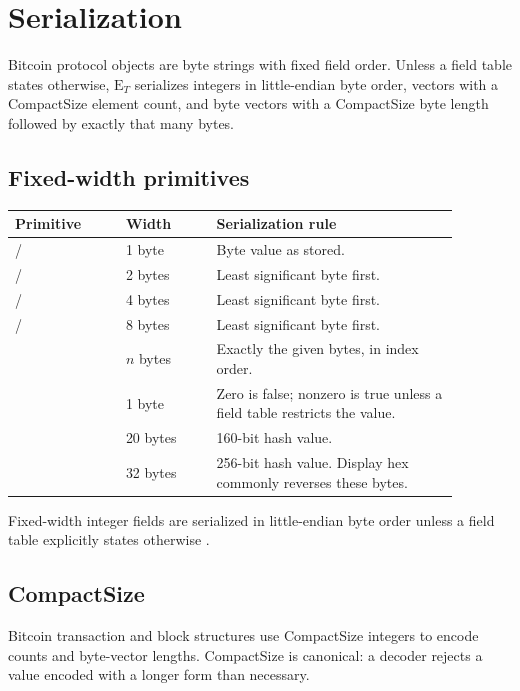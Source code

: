 \section{Serialization}
\label{sec:serialization}

Bitcoin protocol objects are byte strings with fixed field order. Unless a
field table states otherwise, \(\mathrm{E}_{T}\) serializes integers in
little-endian byte order, vectors with a CompactSize element count, and byte
vectors with a CompactSize byte length followed by exactly that many bytes.

\subsection{Fixed-width primitives}

\begin{longtable}{@{}L{0.22\linewidth}L{0.18\linewidth}L{0.48\linewidth}@{}}
\toprule
Primitive & Width & Serialization rule \\
\midrule
{} /  & 1 byte & Byte value as stored. \\
 /  & 2 bytes & Least significant byte first. \\
 /  & 4 bytes & Least significant byte first. \\
 /  & 8 bytes & Least significant byte first. \\
 & $n$ bytes & Exactly the given bytes, in index order. \\
 & 1 byte & Zero is false; nonzero is true unless a field table restricts the value. \\
 & 20 bytes & 160-bit hash value. \\
 & 32 bytes & 256-bit hash value. Display hex commonly reverses these bytes. \\
\bottomrule
\end{longtable}

Fixed-width integer fields are serialized in little-endian byte order unless a
field table explicitly states otherwise \cite{bitcoin-core-v31}.

\subsection{CompactSize}

Bitcoin transaction and block structures use CompactSize integers to encode
counts and byte-vector lengths. CompactSize is canonical: a decoder rejects a
value encoded with a longer form than necessary.

